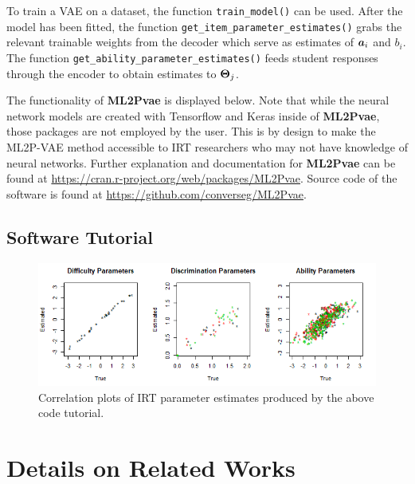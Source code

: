 To train a VAE on a dataset, the function {\color{blue}\verb!train_model()!} can be used. After the model has been fitted, the function {\color{blue}\verb!get_item_parameter_estimates()!} grabs the relevant trainable weights from the decoder which serve as estimates of $\boldsymbol{a}_i$ and $b_i$. The function {\color{blue}\verb!get_ability_parameter_estimates()!} feeds student responses through the encoder to obtain estimates to $\boldsymbol{\Theta}_j$.

The functionality of \textbf{ML2Pvae} is displayed below. Note that while the neural network models are created with Tensorflow and Keras \cite{keras_r} inside of \textbf{ML2Pvae}, those packages are not employed by the user. This is by design to make the ML2P-VAE method accessible to IRT researchers who may not have knowledge of neural networks. Further explanation and documentation for \textbf{ML2Pvae} can be found at {\color{violet}\href{https://cran.r-project.org/web/packages/ML2Pvae}{https://cran.r-project.org/web/packages/ML2Pvae}}. Source code of the software is found at {\color{violet}\href{https://github.com/converseg/ML2Pvae}{https://github.com/converseg/ML2Pvae}}.

\section{Software Tutorial}
\vspace{.5cm}


\begin{figure}[h]
  \centering
  \includegraphics[width=.95\textwidth]{img/ml2pvae_tutorial_plots.png}
  \caption{Correlation plots of IRT parameter estimates produced by the above code tutorial.}
  \label{fig:tutorial_plots}
\end{figure}

\chapter{Details on Related Works}


